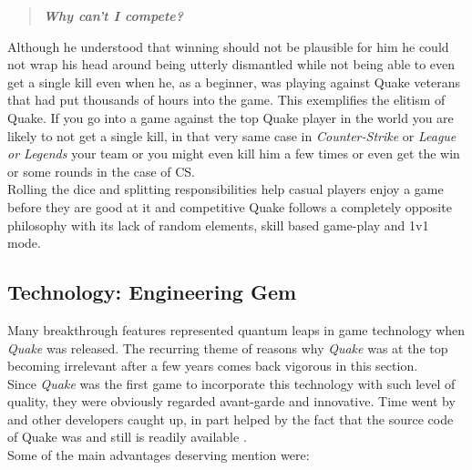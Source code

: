 \begin{quote}
\begin{center}
\textit{\textbf{Why can't I compete?}}
\end{center}
\end{quote}

Although he understood that winning should not be plausible for him he could not wrap his head around being utterly dismantled while not being able to even get a single kill even when he, as a beginner, was playing against Quake veterans that had put thousands of hours into the game. This exemplifies the elitism of Quake. If you go into a game against the top Quake player in the world you are likely to not get a single kill, in that very same case in \textit{Counter-Strike} or \textit{League or Legends} your team or you might even kill him a few times or even get the win or some rounds in the case of CS.\\

Rolling the dice and splitting responsibilities help casual players enjoy a game before they are good at it and competitive Quake follows a completely opposite philosophy with its lack of random elements, skill based game-play and 1v1 mode.\\ 


\subsection{Technology: Engineering Gem}

Many breakthrough features represented quantum leaps in game technology when \textit{Quake} was released. The recurring theme of reasons why \textit{Quake} was at the top becoming irrelevant after a few years comes back vigorous in this section.\\

Since \textit{Quake} was the first game to incorporate this technology with such level of quality, they were obviously regarded avant-garde and innovative. Time went by and other developers caught up, in part helped by the fact that the source code of Quake was and still is readily available \citep{git:id}.\\

Some of the main advantages deserving mention were:

